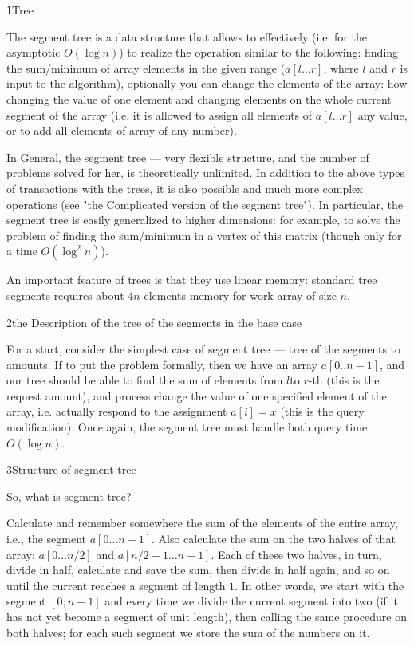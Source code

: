 \h1{Tree}

The segment tree is a data structure that allows to effectively (i.e. for the asymptotic $O (\log n)$) to realize the operation similar to the following: finding the sum/minimum of array elements in the given range ($a[l \ldots r]$, where $l$ and $r$ is input to the algorithm), optionally you can change the elements of the array: how changing the value of one element and changing elements on the whole current segment of the array (i.e. it is allowed to assign all elements of $a[l \ldots r]$ any value, or to add all elements of array of any number).

In General, the segment tree --- very flexible structure, and the number of problems solved for her, is theoretically unlimited. In addition to the above types of transactions with the trees, it is also possible and much more complex operations (see "the Complicated version of the segment tree"). In particular, the segment tree is easily generalized to higher dimensions: for example, to solve the problem of finding the sum/minimum in a vertex of this matrix (though only for a time $O (\log^2 n)$).

An important feature of trees is that they use linear memory: standard tree segments requires about $4n$ elements memory for work array of size $n$.


\h2{the Description of the tree of the segments in the base case}

For a start, consider the simplest case of segment tree --- tree of the segments to amounts. If to put the problem formally, then we have an array $a[0..n-1]$, and our tree should be able to find the sum of elements from $l$to $r$-th (this is the request amount), and process change the value of one specified element of the array, i.e. actually respond to the assignment $a[i]=x$ (this is the query modification). Once again, the segment tree must handle both query time $O (\log n)$.


\h3{Structure of segment tree}

So, what is segment tree?

Calculate and remember somewhere the sum of the elements of the entire array, i.e., the segment $a[0 \ldots n-1]$. Also calculate the sum on the two halves of that array: $a[0 \ldots n/2]$ and $a[n/2+1 \ldots n-1]$. Each of these two halves, in turn, divide in half, calculate and save the sum, then divide in half again, and so on until the current reaches a segment of length $1$. In other words, we start with the segment $[0;n-1]$ and every time we divide the current segment into two (if it has not yet become a segment of unit length), then calling the same procedure on both halves; for each such segment we store the sum of the numbers on it.

